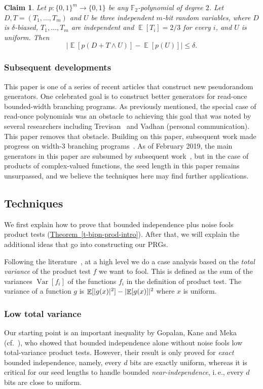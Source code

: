 \documentclass[11pt]{article}
\numberwithin{equation}{section}
\newtheorem{claim}[theorem]{Claim}
\theoremstyle{definition}
\theoremstyle{plain}
\newcommand{\ie}{i.\,e.}
\newcommand{\expref}[2]{\hyperref[#2]{#1~\ref{#2}}}
\newcommand{\zo}{\{0,1\}}
\newcommand\F{\mathbb F}
\DeclarePairedDelimiter{\abs}{\lvert}{\rvert}
\DeclareMathOperator*{\E}{\mathbb{E}}                 %
\DeclareMathOperator*{\Var}{Var}                 %
\begin{document}
\begin{claim} \label{claim:bipnf-deg2}
  Let $p\colon \zo^m \to \zo$ be any $\F_2$-polynomial of degree $2$.
  Let $D,T = (T_1, \ldots, T_m)$ and $U$ be three independent $m$-bit random variables, where $D$ is  %
  $\delta$-biased, $T_1, \dots, T_m$ are independent and $\E[T_i]=2/3$ for every $i$, and $U$ is uniform.  %
  Then 
  \[
    \bigl| \E[p(D + T \wedge U)] - \E[p(U)] \bigr| \le \delta .
  \]
\end{claim}

\subsubsection{Subsequent developments}  %
This paper is one of a series of recent %
articles  %
that construct new pseudorandom generators.  One celebrated goal is to construct better generators for read-once bounded-width branching programs.
As previously mentioned, the special case of read-once polynomials was an
obstacle to achieving this goal that was noted by several researchers
including Trevisan~\cite{Trevisan10-openproblems} and Vadhan (personal
communication).  This paper %
removes that obstacle.  %
Building on this paper, subsequent work made progress on width-3 
branching programs~\cite{MekaRT19}.
As of February 2019, the main generators in this paper are subsumed by
subsequent %
work~\cite{MekaRT19,Lee19},  %
but in the case of products of complex-valued functions, the seed length in this paper remains unsurpassed, and we believe the techniques here may find further applications.

\subsection{Techniques} \label{sec:techniques}

We first explain how to prove
that  %
bounded independence plus noise fools product
%
tests (\expref{Theorem}{t-bipn-prod-intro}).   %
After that, we will explain the additional ideas that go into
constructing our PRGs.

Following the literature~\cite{GopalanMRTV12,GopalanMRZ13,GopalanY14},
at a high level we do a case analysis based on the
\emph{total variance} %
%
of the product test $f$ we want to fool.
This is defined as the sum of the variances $\Var[f_i]$ of the functions $f_i$ in
the definition of product test.
The variance of a function $g$ is
$\E[\abs{g(x)}^2]- \abs{\E[g(x)]}^2$ where $x$ is uniform.
%
%

\subsubsection{Low total variance}    %
Our starting point is 
%
%
an important  %
inequality
%
by Gopalan, Kane and Meka~\cite{GopalanKM18} (cf.~\cite{GopalanMRTV12,GopalanY14}),
who showed that bounded independence alone without noise fools low
total-variance product tests.  %
However, their result %
%
%
is only proved for \emph{exact} bounded independence,
%
%
namely,
every $d$ bits are exactly uniform,
whereas it is critical for our seed lengths to handle
%
%
bounded \emph{near-independence},
%
%
%
\ie, every $d$ bits are close to uniform.  %
%
\end{document}
